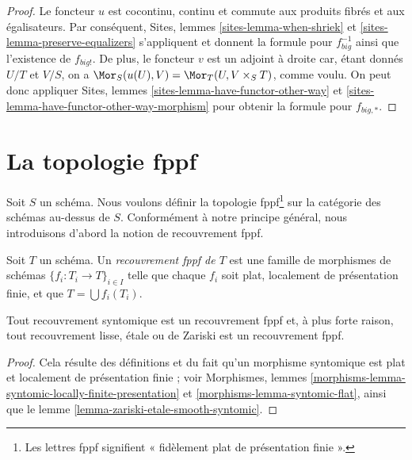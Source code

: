 \begin{proof}
Le foncteur $u$ est cocontinu, continu et commute aux produits fibrés
et aux égalisateurs. Par conséquent,
Sites, lemmes \ref{sites-lemma-when-shriek} et
\ref{sites-lemma-preserve-equalizers}
s'appliquent et donnent la formule
pour $f_{big}^{-1}$ ainsi que l'existence de $f_{big!}$. De plus,
le foncteur $v$ est un adjoint à droite car, étant donnés $U/T$ et $V/S$,
on a $\Mor_S(u(U), V) = \Mor_T(U, V \times_S T)$,
comme voulu. On peut donc appliquer
Sites, lemmes \ref{sites-lemma-have-functor-other-way} et
\ref{sites-lemma-have-functor-other-way-morphism} pour obtenir la
formule pour $f_{big, *}$.
\end{proof}













\section{La topologie fppf}
\label{section-fppf}

\noindent
Soit $S$ un schéma. Nous voulons définir la topologie fppf\footnote{
Les lettres fppf signifient « fid\`element plat de pr\'esentation finie ».} sur
la catégorie des schémas au-dessus de $S$. Conformément à notre principe général,
nous introduisons d'abord la notion de recouvrement fppf.

\begin{definition}
\label{definition-fppf-covering}
Soit $T$ un schéma. Un {\it recouvrement fppf de $T$} est une famille
de morphismes de schémas $\{f_i : T_i \to T\}_{i \in I}$
telle que chaque $f_i$ soit plat, localement de présentation finie, et
que $T = \bigcup f_i(T_i)$.
\end{definition}

\begin{lemma}
\label{lemma-zariski-etale-smooth-syntomic-fppf}
Tout recouvrement syntomique est un recouvrement fppf et, à plus forte raison,
tout recouvrement lisse, étale ou de Zariski est un recouvrement fppf.
\end{lemma}

\begin{proof}
Cela résulte des définitions et du fait qu'un morphisme syntomique
est plat et localement de présentation finie ; voir
Morphismes, lemmes
\ref{morphisms-lemma-syntomic-locally-finite-presentation} et
\ref{morphisms-lemma-syntomic-flat},
ainsi que
le lemme \ref{lemma-zariski-etale-smooth-syntomic}.
\end{proof}

